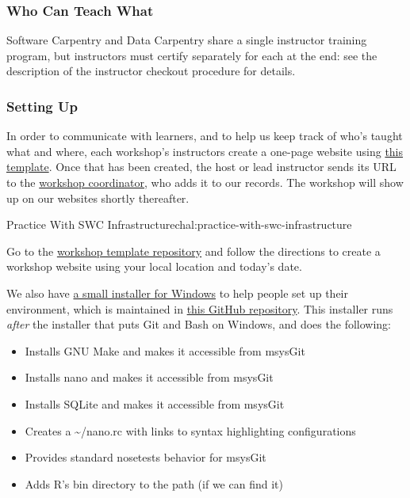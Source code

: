 \subsubsection{Who Can Teach What}\label{who-can-teach-what}

Software Carpentry and Data Carpentry share a single instructor training
program, but instructors must certify separately for each at the end:
see the description of the
instructor checkout procedure for details.

\subsubsection{Setting Up}\label{setting-up}

In order to communicate with learners, and to help us keep track of
who's taught what and where, each workshop's instructors create a
one-page website using \href{\{\{\%20site.workshop\_repo\%20\}\}}{this
template}. Once that has been created, the host or lead instructor sends
its URL to the \href{\{\{\%20site.contact\%20\}\}}{workshop
coordinator}, who adds it to our records. The workshop will show up on
our websites shortly thereafter.

\begin{challenge}{Practice With SWC Infrastructure}{chal:practice-with-swc-infrastructure}

Go to the \href{\{\{\%20site.workshop\_repo\%20\}\}}{workshop template
repository} and follow the directions to create a workshop website using
your local location and today's date.
\end{challenge}

We also have
\href{https://github.com/swcarpentry/windows-installer/releases/download/v0.3/SWCarpentryInstaller.exe}{a
small installer for Windows} to help people set up their environment,
which is maintained in
\href{https://github.com/swcarpentry/windows-installer}{this GitHub
repository}. This installer runs \emph{after} the installer that puts
Git and Bash on Windows, and does the following:

\begin{itemize}
\itemsep1pt\parskip0pt
\item
  Installs GNU Make and makes it accessible from msysGit
\item
  Installs nano and makes it accessible from msysGit
\item
  Installs SQLite and makes it accessible from msysGit
\item
  Creates a \textasciitilde{}/nano.rc with links to syntax highlighting
  configurations
\item
  Provides standard nosetests behavior for msysGit
\item
  Adds R's bin directory to the path (if we can find it)
\end{itemize}

